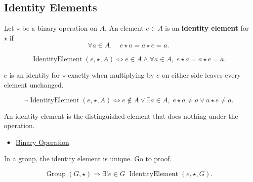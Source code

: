 \subsection*{Identity Elements}
\label{subsec:identity-elements}

\begin{definition}
\label{def:identity-element}
Let $\star$ be a binary operation on $A$.
An element $e\in A$ is an \textbf{identity element} for $\star$ if
\[
\forall a\in A,\quad e\star a=a\star e=a.
\]
\end{definition}

\begin{remark*}
\[
\operatorname{IdentityElement}(e,\star,A)
\Longleftrightarrow
e\in A
\land
\forall a\in A,\; e\star a=a\star e=a.
\]
\end{remark*}

\begin{remark*}
$e$ is an identity for $\star$ exactly when multiplying by $e$ on either side
leaves every element unchanged.
\end{remark*}

\begin{remark*}
\[
\neg\operatorname{IdentityElement}(e,\star,A)
\Longleftrightarrow
e\notin A
\lor
\exists a\in A,\; e\star a\neq a \lor a\star e\neq a.
\]
\end{remark*}

\begin{remark*}[Interpretation]
An identity element is the distinguished element that does nothing under the
operation.
\end{remark*}

\begin{dependencies}
\begin{itemize}
  \item \hyperref[def:binary-operation]{Binary Operation}
\end{itemize}
\end{dependencies}

\begin{proposition}
\label{prop:identity-element-unique}
In a group, the identity element is unique.
\hyperref[prf:group-identity-unique]{Go to proof.}
\end{proposition}

\begin{remark*}
\[
\operatorname{Group}(G,\star)
\Longrightarrow
\exists! e\in G\; \operatorname{IdentityElement}(e,\star,G).
\]
\end{remark*}

